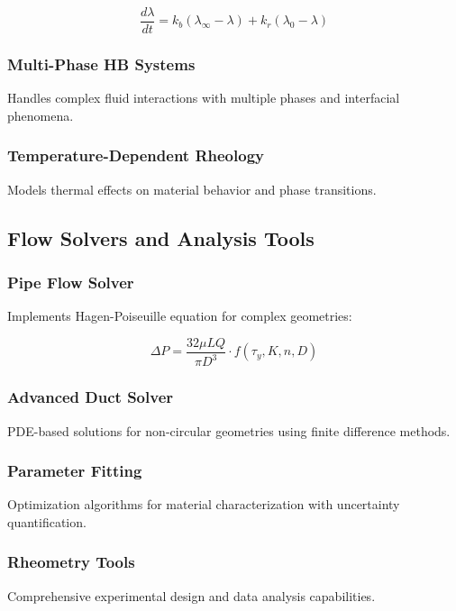 \documentclass[11pt,a4paper]{article}
\begin{document}
\begin{equation}
\frac{d\lambda}{dt} = k_b(\lambda_\infty - \lambda) + k_r(\lambda_0 - \lambda)
\label{eq:thixotropic}
\end{equation}

\subsubsection{Multi-Phase HB Systems}
Handles complex fluid interactions with multiple phases and interfacial phenomena.

\subsubsection{Temperature-Dependent Rheology}
Models thermal effects on material behavior and phase transitions.

\subsection{Flow Solvers and Analysis Tools}

\subsubsection{Pipe Flow Solver}
Implements Hagen-Poiseuille equation for complex geometries:

\begin{equation}
\Delta P = \frac{32\mu L Q}{\pi D^3} \cdot f(\tau_y, K, n, D)
\label{eq:pipe_flow}
\end{equation}

\subsubsection{Advanced Duct Solver}
PDE-based solutions for non-circular geometries using finite difference methods.

\subsubsection{Parameter Fitting}
Optimization algorithms for material characterization with uncertainty quantification.

\subsubsection{Rheometry Tools}
Comprehensive experimental design and data analysis capabilities.
\end{document}
